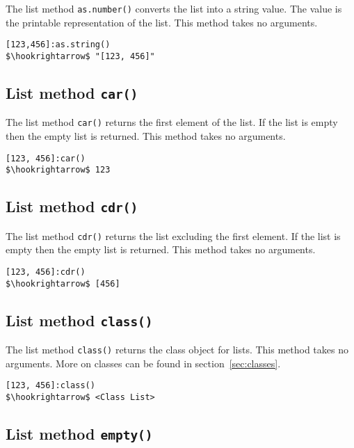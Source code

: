 \documentclass[11pt,a4paper]{scrbook}
\begin{document}
The list method \texttt{as.number()} converts the list into a string value.
The value is the printable representation of the list. This method takes no
arguments.

\begin{lstlisting}[language=BibTool,mathescape=true]
[123,456]:as.string()
$\hookrightarrow$ "[123, 456]"
\end{lstlisting}

\subsection{List method \texttt{car()}}

The list method \texttt{car()} returns the first element of the list. If the
list is empty then the empty list is returned. This method takes no arguments.

\begin{lstlisting}[language=BibTool,mathescape=true]
[123, 456]:car()
$\hookrightarrow$ 123
\end{lstlisting}

\subsection{List method \texttt{cdr()}}

The list method \texttt{cdr()} returns the list excluding the first element.
If the list is empty then the empty list is returned. This method takes no
arguments.

\begin{lstlisting}[language=BibTool,mathescape=true]
[123, 456]:cdr()
$\hookrightarrow$ [456]
\end{lstlisting}

\subsection{List method \texttt{class()}}

The list method \texttt{class()} returns the class object for lists. This
method takes no arguments. More on classes can be found in
section~\ref{sec:classes}.

\begin{lstlisting}[language=BibTool,mathescape=true]
[123, 456]:class()
$\hookrightarrow$ <Class List>
\end{lstlisting}

\subsection{List method \texttt{empty()}}
\end{document}
